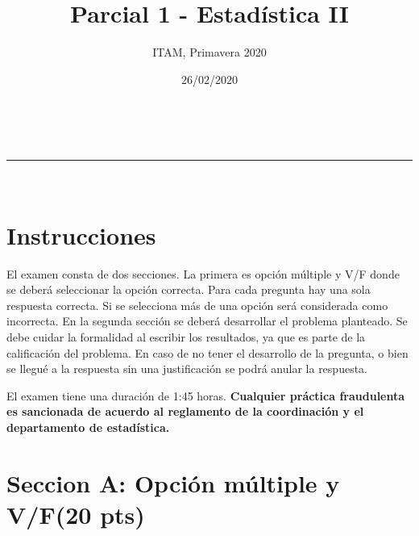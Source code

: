 \documentclass[addpoints]{exam}
\makeatletter
\newcommand{\linia}{\rule{\linewidth}{0.5pt}}
\theoremstyle{mytheor}
\renewcommand{\maketitle}{
    \begin{center}
    \vspace{2ex}
    {\huge \textsc{\@title}}
    \vspace{1ex}
    \\
    \linia\\
    \@author \hfill \@date
    \vspace{4ex}
    \end{center}
  }
\makeatother
\begin{document}
  
  \title{Parcial 1 - Estadística II}
  
  \author{ITAM, Primavera 2020}
  
  \date{26/02/2020}
  
  \maketitle
  
  \section*{Instrucciones}
  
El examen consta de dos secciones. La primera es opción múltiple y V/F donde se deberá seleccionar la opción correcta. Para cada pregunta hay una sola respuesta correcta. Si se selecciona más de una opción será considerada como incorrecta. En la segunda sección se deberá desarrollar el problema planteado. Se debe cuidar la formalidad al escribir los resultados, ya que es parte de la calificación del problema. En caso de no tener el desarrollo de la pregunta, o bien se llegué a la respuesta sin una justificación se podrá anular la respuesta. 
  
  \vspace{10pt}
  
El examen tiene una duración de 1:45 horas. \textbf{Cualquier práctica fraudulenta es sancionada de acuerdo al reglamento de la coordinación y el departamento de estadística.} 
  
  \section*{Seccion A: Opción múltiple y V/F(20 pts)}
  
\end{document}
